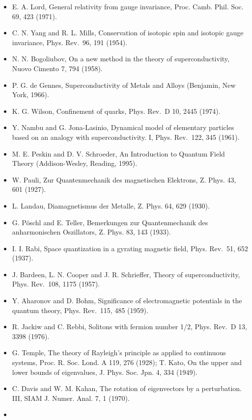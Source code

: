 \documentclass[
  10pt,
]{article}
\providecommand{\tightlist}{%
  \setlength{\itemsep}{0pt}\setlength{\parskip}{0pt}}
\begin{document}
\begin{itemize}
\tightlist
\item
  E. A. Lord, General relativity from gauge invariance, Proc. Camb.
  Phil. Soc. 69, 423 (1971).
\item
  C. N. Yang and R. L. Mills, Conservation of isotopic spin and isotopic
  gauge invariance, Phys. Rev.~96, 191 (1954).
\item
  N. N. Bogoliubov, On a new method in the theory of superconductivity,
  Nuovo Cimento 7, 794 (1958).
\item
  P. G. de Gennes, Superconductivity of Metals and Alloys (Benjamin, New
  York, 1966).
\item
  K. G. Wilson, Confinement of quarks, Phys. Rev.~D 10, 2445 (1974).
\item
  Y. Nambu and G. Jona-Lasinio, Dynamical model of elementary particles
  based on an analogy with superconductivity. I, Phys. Rev.~122, 345
  (1961).
\item
  M. E. Peskin and D. V. Schroeder, An Introduction to Quantum Field
  Theory (Addison-Wesley, Reading, 1995).
\item
  W. Pauli, Zur Quantenmechanik des magnetischen Elektrons, Z. Phys. 43,
  601 (1927).
\item
  L. Landau, Diamagnetismus der Metalle, Z. Phys. 64, 629 (1930).
\item
  G. Pöschl and E. Teller, Bemerkungen zur Quantenmechanik des
  anharmonischen Oszillators, Z. Phys. 83, 143 (1933).
\item
  I. I. Rabi, Space quantization in a gyrating magnetic field, Phys.
  Rev.~51, 652 (1937).
\item
  J. Bardeen, L. N. Cooper and J. R. Schrieffer, Theory of
  superconductivity, Phys. Rev.~108, 1175 (1957).
\item
  Y. Aharonov and D. Bohm, Significance of electromagnetic potentials in
  the quantum theory, Phys. Rev.~115, 485 (1959).
\item
  R. Jackiw and C. Rebbi, Solitons with fermion number 1/2, Phys. Rev.~D
  13, 3398 (1976).
\item
  G. Temple, The theory of Rayleigh's principle as applied to continuous
  systems, Proc. R. Soc. Lond. A 119, 276 (1928); T. Kato, On the upper
  and lower bounds of eigenvalues, J. Phys. Soc. Jpn. 4, 334 (1949).
\item
  C. Davis and W. M. Kahan, The rotation of eigenvectors by a
  perturbation. III, SIAM J. Numer. Anal. 7, 1 (1970).
\item

\end{itemize}
\end{document}
